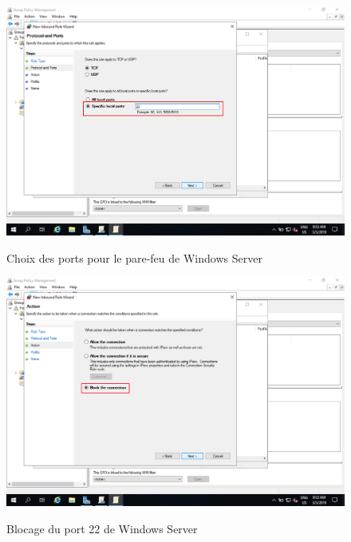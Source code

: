 \begin{figure}[h!]
	\begin{center}
		\caption{Choix des ports pour le pare-feu de Windows Server}
		\includegraphics[scale=0.5]{WS_Screenshots/gpo_18.png}
		\label{WS_Screenshots/gpo_18}
	\end{center}
\end{figure}
\FloatBarrier 
    

\begin{figure}[h!]
	\begin{center}
		\caption{Blocage du port 22 de Windows Server}
		\includegraphics[scale=0.5]{WS_Screenshots/gpo_19.png}
		\label{WS_Screenshots/gpo_19}
	\end{center}
\end{figure}
\FloatBarrier 
    

